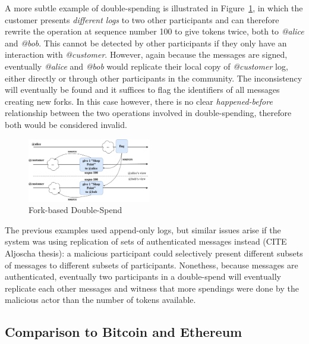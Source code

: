 \documentclass[sigplan,screen,10pt]{acmart}
\begin{document}
A more subtle example of double-spending is illustrated in Figure~\ref{figure:fork-double-spend}, in which the customer presents \textit{different logs} to two other participants and can therefore rewrite the operation at sequence number 100 to give tokens twice, both to \textit{@alice} and \textit{@bob}. This cannot be detected by other participants if they only have an interaction with \textit{@customer}. However, again because the messages are signed, eventually \textit{@alice} and \textit{@bob} would replicate their local copy of \textit{@customer} log, either directly or through other participants in the community. The inconsistency will eventually be found and it suffices to flag the identifiers of all messages creating new forks. In this case however, there is no clear \textit{happened-before} relationship between the two operations involved in double-spending, therefore both would be considered invalid.

\begin{figure}[htbp]
\centering
\includegraphics[width=0.48\textwidth]{figures/fork-double-spend-drawio}
\caption{Fork-based Double-Spend}
\label{figure:fork-double-spend}
\end{figure}

The previous examples used append-only logs, but similar issues arise if the system was using replication of sets of authenticated messages instead (CITE Aljoscha thesis): a malicious participant could selectively present different subsets of messages to different subsets of participants. Nonethess, because messages are authenticated, eventually two participants in a double-spend will eventually replicate each other messages and witness that more spendings were done by the malicious actor than the number of tokens available.

\subsection{Comparison to Bitcoin and Ethereum}
\end{document}
